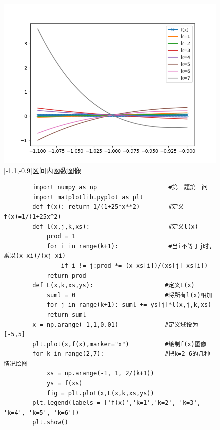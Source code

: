 \documentclass[UTF8,9pt]{ctexart}
\begin{document}
\begin{figure}[htbp]
        \centering
        \begin{minipage}[t]{0.48\textwidth}
        \centering
        \includegraphics[scale=0.4]{3.png}
        \caption{[-1.1,-0.9]区间内函数图像}
        \end{minipage}
\end{figure}
\begin{figure}[htbp]
\begin{lstlisting}
        import numpy as np                    #第一题第一问
        import matplotlib.pyplot as plt       
        def f(x): return 1/(1+25*x**2)        #定义f(x)=1/(1+25x^2)
        def l(x,j,k,xs):                      #定义l(x)
            prod = 1                          
            for i in range(k+1):              #当i不等于j时, 乘以(x-xi)/(xj-xi)
                if i != j:prod *= (x-xs[i])/(xs[j]-xs[i])   
            return prod                       
        def L(x,k,xs,ys):                    #定义L(x)
            suml = 0                         #将所有l(x)相加
            for j in range(k+1): suml += ys[j]*l(x,j,k,xs)
            return suml
        x = np.arange(-1,1,0.01)             #定义域设为[-5,5]
        plt.plot(x,f(x),marker="x")          #绘制f(x)图像
        for k in range(2,7):                 #把k=2-6的几种情况绘图
            xs = np.arange(-1, 1, 2/(k+1))
            ys = f(xs)
            fig = plt.plot(x,L(x,k,xs,ys))
        plt.legend(labels = ['f(x)','k=1','k=2', 'k=3', 'k=4', 'k=5', 'k=6'])
        plt.show()
\end{lstlisting}
\end{figure}
\end{document}
